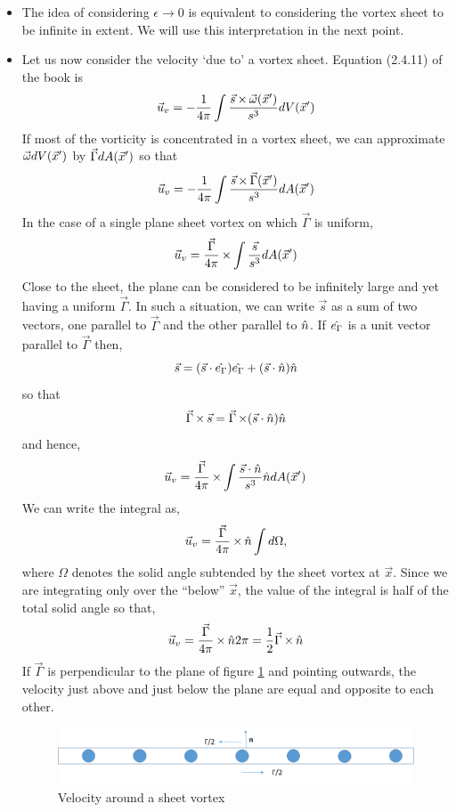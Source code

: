 \begin{itemize}
\item The idea of considering $\epsilon \rightarrow 0$ is equivalent to considering the vortex sheet to be infinite in extent. We will use this interpretation in the next point.

\item Let us now consider the velocity \enquote*{due to} a vortex sheet. Equation (2.4.11) of the book is
\[
\vec{u}_v = -\frac{1}{4\pi}\int\frac{\vec{s}\operatorname{\times}\vec{\omega}(\vec{x}^\prime)}{s^3} dV(\vec{x}^\prime)
\]
If most of the vorticity is concentrated in a vortex sheet, we can approximate $\vec{\omega} dV(\vec{x}^\prime)$ by $\vec{\Gamma} dA(\vec{x}^\prime)$ so that
\[
\vec{u}_v = -\frac{1}{4\pi}\int\frac{\vec{s}\operatorname{\times}\vec{\Gamma}(\vec{x}^\prime)}{s^3} dA(\vec{x}^\prime)
\]
In the case of a single plane sheet vortex on which $\vec{\Gamma}$ is uniform,
\[
\vec{u}_v = \frac{\vec{\Gamma}}{4\pi}\operatorname{\times}\int\frac{\vec{s}}{s^3} dA(\vec{x}^\prime)
\]
Close to the sheet, the plane can be considered to be infinitely large and yet having a uniform $\vec{\Gamma}$. In such a situation, we can write $\vec{s}$ as a sum of two vectors,
one parallel to $\vec{\Gamma}$ and the other parallel to $\hat{n}$. If $\hat{e_{\Gamma}}$ is a unit vector parallel to $\vec{\Gamma}$ then,
\[
\vec{s} = (\vec{s}\cdot\hat{e_{\Gamma}})\hat{e_{\Gamma}} + (\vec{s}\cdot\hat{n})\hat{n}
\]
so that
\[
\vec{\Gamma} \operatorname{\times} \vec{s} = \vec{\Gamma} \operatorname{\times} (\vec{s}\cdot\hat{n})\hat{n}
\]
and hence,
\[
\vec{u}_v = \frac{\vec{\Gamma}}{4\pi}\operatorname{\times}\int\frac{\vec{s}\cdot\hat{n}}{s^3}\hat{n} dA(\vec{x}^\prime)
\]
We can write the integral as,
\[
\vec{u}_v = \frac{\vec{\Gamma}}{4\pi}\operatorname{\times}\hat{n} \int d\Omega,
\]
where $\Omega$ denotes the solid angle subtended by the sheet vortex at $\vec{x}$. Since we are integrating only over the \enquote{below} $\vec{x}$, the value of the integral is half
of the total solid angle so that,
\[
\vec{u}_v = \frac{\vec{\Gamma}}{4\pi}\operatorname{\times}\hat{n} 2\pi = \frac{1}{2}\vec{\Gamma}\operatorname{\times}\hat{n}
\]
If $\vec{\Gamma}$ is perpendicular to the plane of figure \ref{c2f6} and pointing outwards, the velocity just above and just below the plane are equal and opposite to each other.
\begin{figure}[!ht]
\centering
\centerline{\includegraphics[scale=.35]{c2f6}}
\caption{Velocity around a sheet vortex}
\label{c2f6}
\end{figure}


\end{itemize}
